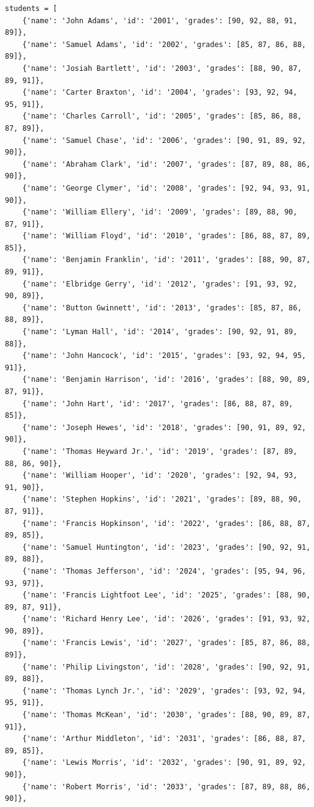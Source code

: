 \documentclass[12pt]{article}
\begin{document}
\begin{verbatim}
students = [
    {'name': 'John Adams', 'id': '2001', 'grades': [90, 92, 88, 91, 89]},
    {'name': 'Samuel Adams', 'id': '2002', 'grades': [85, 87, 86, 88, 89]},
    {'name': 'Josiah Bartlett', 'id': '2003', 'grades': [88, 90, 87, 89, 91]},
    {'name': 'Carter Braxton', 'id': '2004', 'grades': [93, 92, 94, 95, 91]},
    {'name': 'Charles Carroll', 'id': '2005', 'grades': [85, 86, 88, 87, 89]},
    {'name': 'Samuel Chase', 'id': '2006', 'grades': [90, 91, 89, 92, 90]},
    {'name': 'Abraham Clark', 'id': '2007', 'grades': [87, 89, 88, 86, 90]},
    {'name': 'George Clymer', 'id': '2008', 'grades': [92, 94, 93, 91, 90]},
    {'name': 'William Ellery', 'id': '2009', 'grades': [89, 88, 90, 87, 91]},
    {'name': 'William Floyd', 'id': '2010', 'grades': [86, 88, 87, 89, 85]},
    {'name': 'Benjamin Franklin', 'id': '2011', 'grades': [88, 90, 87, 89, 91]},
    {'name': 'Elbridge Gerry', 'id': '2012', 'grades': [91, 93, 92, 90, 89]},
    {'name': 'Button Gwinnett', 'id': '2013', 'grades': [85, 87, 86, 88, 89]},
    {'name': 'Lyman Hall', 'id': '2014', 'grades': [90, 92, 91, 89, 88]},
    {'name': 'John Hancock', 'id': '2015', 'grades': [93, 92, 94, 95, 91]},
    {'name': 'Benjamin Harrison', 'id': '2016', 'grades': [88, 90, 89, 87, 91]},
    {'name': 'John Hart', 'id': '2017', 'grades': [86, 88, 87, 89, 85]},
    {'name': 'Joseph Hewes', 'id': '2018', 'grades': [90, 91, 89, 92, 90]},
    {'name': 'Thomas Heyward Jr.', 'id': '2019', 'grades': [87, 89, 88, 86, 90]},
    {'name': 'William Hooper', 'id': '2020', 'grades': [92, 94, 93, 91, 90]},
    {'name': 'Stephen Hopkins', 'id': '2021', 'grades': [89, 88, 90, 87, 91]},
    {'name': 'Francis Hopkinson', 'id': '2022', 'grades': [86, 88, 87, 89, 85]},
    {'name': 'Samuel Huntington', 'id': '2023', 'grades': [90, 92, 91, 89, 88]},
    {'name': 'Thomas Jefferson', 'id': '2024', 'grades': [95, 94, 96, 93, 97]},
    {'name': 'Francis Lightfoot Lee', 'id': '2025', 'grades': [88, 90, 89, 87, 91]},
    {'name': 'Richard Henry Lee', 'id': '2026', 'grades': [91, 93, 92, 90, 89]},
    {'name': 'Francis Lewis', 'id': '2027', 'grades': [85, 87, 86, 88, 89]},
    {'name': 'Philip Livingston', 'id': '2028', 'grades': [90, 92, 91, 89, 88]},
    {'name': 'Thomas Lynch Jr.', 'id': '2029', 'grades': [93, 92, 94, 95, 91]},
    {'name': 'Thomas McKean', 'id': '2030', 'grades': [88, 90, 89, 87, 91]},
    {'name': 'Arthur Middleton', 'id': '2031', 'grades': [86, 88, 87, 89, 85]},
    {'name': 'Lewis Morris', 'id': '2032', 'grades': [90, 91, 89, 92, 90]},
    {'name': 'Robert Morris', 'id': '2033', 'grades': [87, 89, 88, 86, 90]},

\end{verbatim}
\end{document}
